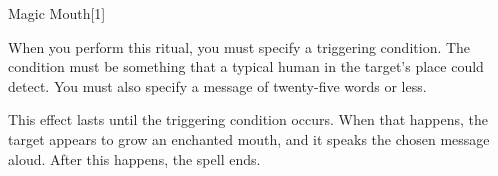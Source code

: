 \begin{spellsection}{Magic Mouth}[1]

\begin{spellcontent}

\begin{spelltargetinginfo}



\end{spelltargetinginfo}


\begin{spelleffects}
\spellspecial
When you perform this ritual, you must specify a triggering condition.
The condition must be something that a typical human in the target's place could detect.
You must also specify a message of twenty-five words or less.



\spelleffect
This effect lasts until the triggering condition occurs.
When that happens, the target appears to grow an enchanted mouth, and it speaks the chosen message aloud.
After this happens, the spell ends.








\end{spelleffects}

\end{spellcontent}
\begin{spellfooter}


\end{spellfooter}
\begin{spellsubcontent}


\end{spellsubcontent}
\end{spellsection}


